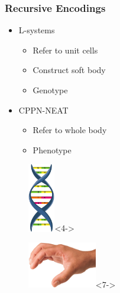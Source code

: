 \documentclass[serif, pdf]{beamer}
\begin{document}

\begin{frame}
    \frametitle{Recursive Encodings}
    \begin{minipage}{0.7\textwidth}
        \begin{itemize}
            \item<1-> L-systems
            \changefontsizes{11pt}
            \begin{itemize}
                \item<2-> Refer to unit cells
                \item<3-> Construct soft body
                \item<4-> Genotype
            \end{itemize}
            \item<5-> CPPN-NEAT
            \changefontsizes{11pt}
            \begin{itemize}
                \item<6-> Refer to whole body
                \item<7-> Phenotype
            \end{itemize}
        \end{itemize}
    \end{minipage}
    \begin{minipage}{0.25\textwidth}
    \begin{figure}
        \centering
        \includegraphics[height = 3cm]{Genotype.png}<4->
    \end{figure}
    \begin{figure}
        \centering
        \includegraphics[height = 2cm]{Phenotype.png}<7->
    \end{figure}
    \end{minipage}
\end{frame}

\end{document}
